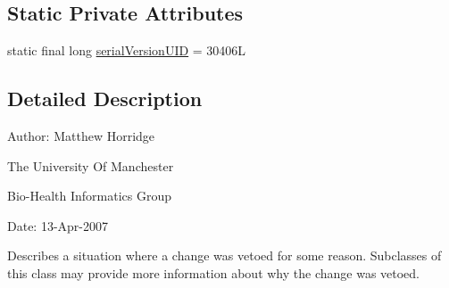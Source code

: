 \subsection*{Static Private Attributes}
\begin{DoxyCompactItemize}
\item 
static final long \hyperlink{classorg_1_1semanticweb_1_1owlapi_1_1model_1_1_o_w_l_ontology_change_veto_exception_afb586775b45425d9b2d03d1ca8d73065}{serial\-Version\-U\-I\-D} = 30406\-L
\end{DoxyCompactItemize}


\subsection{Detailed Description}
Author\-: Matthew Horridge\par
 The University Of Manchester\par
 Bio-\/\-Health Informatics Group\par
 Date\-: 13-\/\-Apr-\/2007\par
\par


Describes a situation where a change was vetoed for some reason. Subclasses of this class may provide more information about why the change was vetoed. 

